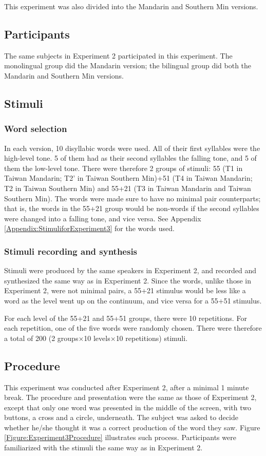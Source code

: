 This experiment was also divided into the Mandarin and Southern Min versions.

\subsection{Participants}
The same subjects in Experiment 2 participated in this experiment. The monolingual group did the Mandarin version; the bilingual group did both the Mandarin and Southern Min versions.

\subsection{Stimuli}
\subsubsection{Word selection} In each version, 10 disyllabic words were used. All of their first syllables were the high-level tone. 5 of them had as their second syllables the falling tone, and 5 of them the low-level tone. There were therefore 2 groups of stimuli: 55 (T1 in Taiwan Mandarin; T2' in Taiwan Southern Min)+51 (T4 in Taiwan Mandarin; T2 in Taiwan Southern Min) and 55+21 (T3 in Taiwan Mandarin and Taiwan Southern Min). The words were made sure to have no minimal pair counterparts; that is, the words in the 55+21 group would be non-words if the second syllables were changed into a falling tone, and vice versa. See Appendix \ref{Appendix:StimuliforExperiment3} for the words used.

\subsubsection{Stimuli recording and synthesis}
Stimuli were produced by the same speakers in Experiment 2, and recorded and synthesized the same way as in Experiment 2. Since the words, unlike those in Experiment 2, were not minimal pairs, a 55+21 stimulus would be less like a word as the level went up on the continuum, and vice versa for a 55+51 stimulus.

For each level of the 55+21 and 55+51 groups, there were 10 repetitions. For each repetition, one of the five words were randomly chosen. There were therefore a total of 200 (2 groups$\times$10 levels$\times$10 repetitions) stimuli.

\subsection{Procedure}
This experiment was conducted after Experiment 2, after a minimal 1 minute break. The procedure and presentation were the same as those of Experiment 2, except that only one word was presented in the middle of the screen, with two buttons, a cross and a circle, underneath. The subject was asked to decide whether he/she thought it was a correct production of the word they saw. Figure \ref{Figure:Experiment3Procedure} illustrates such process. Participants were familiarized with the stimuli the same way as in Experiment 2.

